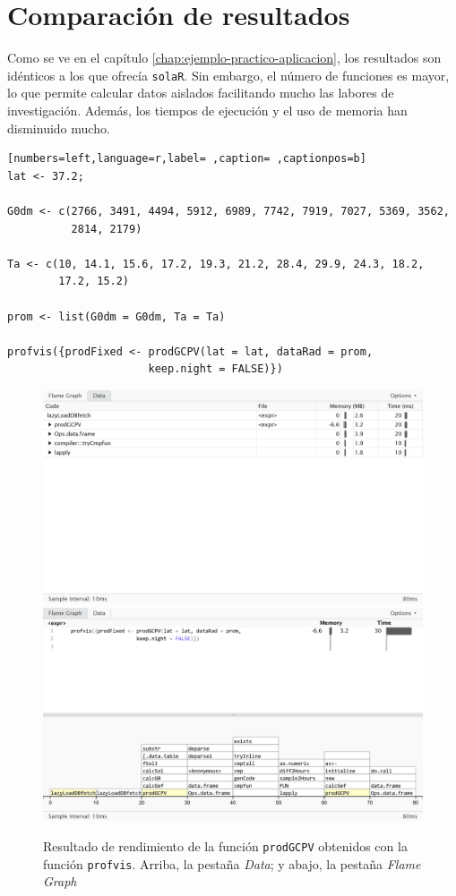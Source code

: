 \section{Comparación de resultados}
\label{sec:orge0c8016}
Como se ve en el capítulo \ref{chap:ejemplo-practico-aplicacion}, los resultados son idénticos a los que ofrecía \texttt{solaR}. Sin embargo, el número de funciones es mayor, lo que permite calcular datos aislados facilitando mucho las labores de investigación. Además, los tiempos de ejecución y el uso de memoria han disminuido mucho.
\begin{lstlisting}[numbers=left,language=r,label= ,caption= ,captionpos=b]
lat <- 37.2;

G0dm <- c(2766, 3491, 4494, 5912, 6989, 7742, 7919, 7027, 5369, 3562,
          2814, 2179)

Ta <- c(10, 14.1, 15.6, 17.2, 19.3, 21.2, 28.4, 29.9, 24.3, 18.2,
        17.2, 15.2)

prom <- list(G0dm = G0dm, Ta = Ta)

profvis({prodFixed <- prodGCPV(lat = lat, dataRad = prom,
                      keep.night = FALSE)})
\end{lstlisting}

\begin{figure}[h!]
  \centering
    \includegraphics[width=\textwidth]{figuras/data.png}
    \includegraphics[width=\textwidth]{figuras/flamegraph.png}
  \caption{Resultado de rendimiento de la función \texttt{prodGCPV} obtenidos con la función \texttt{profvis}. Arriba, la pestaña \textit{Data}; y abajo, la pestaña \textit{Flame Graph}}
\end{figure}

